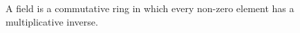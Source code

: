 \begin{definition}[Field]
    A field is a commutative ring in which every non-zero element has a multiplicative inverse.
\end{definition}

